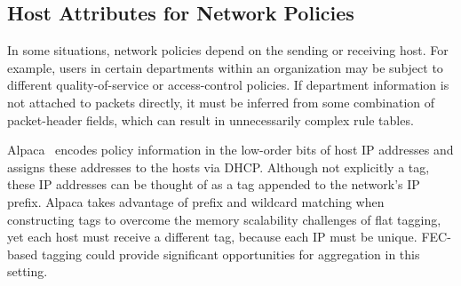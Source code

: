\subsection{Host Attributes for Network Policies}
In some situations, network policies depend on the sending or
receiving host.  For example, users in certain departments within an
organization may be subject to different quality-of-service or 
access-control policies. If department information is not attached to packets
directly, it must be inferred from some combination of packet-header
fields, which can result in unnecessarily complex rule tables.

Alpaca~\cite{alpaca} encodes policy information in the low-order bits
of host IP addresses and assigns these addresses to the hosts via
DHCP. Although not explicitly a tag, these IP addresses can be thought
of as a tag appended to the network's IP prefix. Alpaca takes
advantage of prefix and wildcard matching when constructing tags to
overcome the memory scalability challenges of flat tagging, yet each
host must receive a different tag, because each IP must be
unique. FEC-based tagging could provide significant opportunities for
aggregation in this setting.



